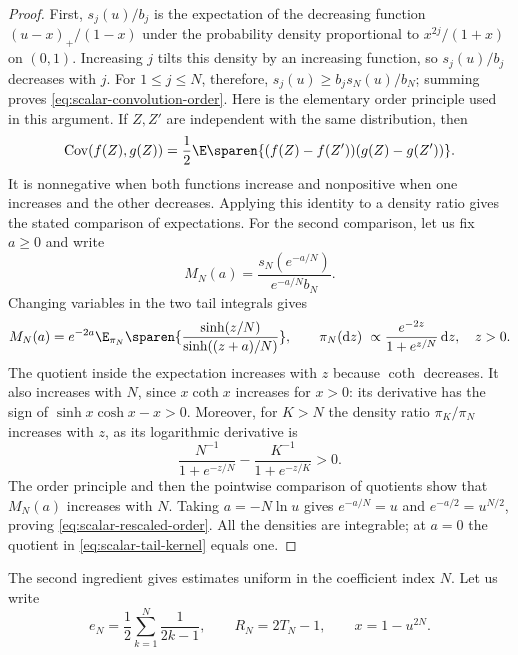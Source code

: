 \begin{proof}
First, $s_j(u)/b_j$ is the expectation of the decreasing function
$(u-x)_+/(1-x)$ under the probability density proportional to
$x^{2j}/(1+x)$ on $(0,1)$. Increasing $j$ tilts this density by an
increasing function, so $s_j(u)/b_j$ decreases with $j$.
For $1\le j\le N$, therefore,
$s_j(u)\ge b_j s_N(u)/b_N$; summing proves
\eqref{eq:scalar-convolution-order}.
Here is the elementary order principle used in this argument.
If $Z,Z'$ are independent with the same distribution, then
\begin{equation*}
  \operatorname{Cov}(f(Z),g(Z))
  =\frac12\E\sparen{(f(Z)-f(Z'))(g(Z)-g(Z'))}.
\end{equation*}
It is nonnegative when both functions increase and nonpositive when
one increases and the other decreases. Applying this identity to a
density ratio gives the stated comparison of expectations.
For the second comparison, let us fix $a\ge0$ and write
\begin{equation*}
  M_N(a)=\frac{s_N(e^{-a/N})}{e^{-a/N}b_N}.
\end{equation*}
Changing variables in the two tail integrals gives
\begin{equation}
  \label{eq:scalar-tail-kernel}
  M_N(a)=e^{-2a}\E_{\pi_N}
  \sparen{\frac{\sinh(z/N)}{\sinh((z+a)/N)}},
  \qquad
  \pi_N(\mathrm{d}z)\ \propto
  \frac{e^{-2z}}{1+e^{z/N}}\,\mathrm{d}z,
  \quad z>0.
\end{equation}
The quotient inside the expectation increases with $z$ because
$\coth$ decreases. It also increases with $N$, since
$x\coth x$ increases for $x>0$:
its derivative has the sign of $\sinh x\cosh x-x>0$.
Moreover, for $K>N$ the density ratio $\pi_K/\pi_N$ increases with
$z$, as its logarithmic derivative is
\begin{equation*}
  \frac{N^{-1}}{1+e^{-z/N}}
  -\frac{K^{-1}}{1+e^{-z/K}}>0.
\end{equation*}
The order principle and then the pointwise comparison of quotients
show that $M_N(a)$ increases with $N$.
Taking $a=-N\ln u$ gives
$e^{-a/N}=u$ and $e^{-a/2}=u^{N/2}$, proving
\eqref{eq:scalar-rescaled-order}.
All the densities are integrable; at $a=0$ the quotient in
\eqref{eq:scalar-tail-kernel} equals one.
\end{proof}
The second ingredient gives estimates uniform in the coefficient
index $N$. Let us write
\begin{equation*}
  e_N=\frac12\sum_{k=1}^N\frac{1}{2k-1},\qquad
  R_N=2T_N-1,\qquad x=1-u^{2N}.
\end{equation*}

